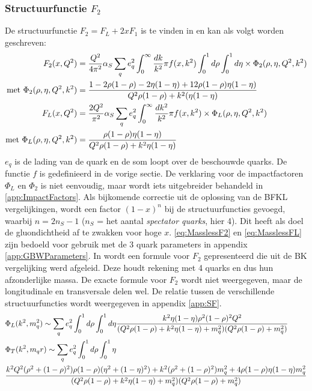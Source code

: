 \documentclass[a4paper,11pt]{article}
\numberwithin{equation}{section} %
\begin{document}
    \subsubsection{Structuurfunctie $F_2$} \label{sec:SF}
De structuurfunctie $F_2 = F_L + 2x F_1$ is te vinden in \cite[vgl. 9.200]{Barone} en kan als volgt worden geschreven:
\begin{align} \label{eq:MasslessF2}
F_2(x,Q^2) &= \frac{Q^2}{4\pi^2} \alpha_S \sum_q e_q^2 \int_0^\infty \frac{dk}{k^2}\pi f(x,k^2) \int_0^1 d\rho \int_0^1 d\eta \times \Phi_2(\rho, \eta, Q^2, k^2) \\
\text{met } \Phi_2(\rho, \eta, Q^2, k^2) &= \frac{1-2\rho(1-\rho)-2\eta(1-\eta)+12\rho(1-\rho)\eta(1-\eta)}{Q^2 \rho(1-\rho) + k^2 (\eta(1-\eta)}\notag \\
F_L(x,Q^2) &= \frac{2 Q^2}{\pi^2} \alpha_S \sum_q e_q^2 \int_0^\infty \frac{dk^2}{k^2} \pi f(x,k^2) \times \Phi_L(\rho, \eta, Q^2, k^2) \label{eq:MasslessFL} \\
\text{met } \Phi_L(\rho, \eta, Q^2, k^2) &= \frac{\rho(1-\rho)\eta(1-\eta)}{Q^2 \rho(1-\rho)+k^2 \eta(1-\eta)} \notag 
\end{align}
$e_q$ is de lading van de quark en de som loopt over de beschouwde quarks.
De functie $f$ is gedefinieerd in de vorige sectie.
De verklaring voor de impactfactoren $\Phi_L$ en $\Phi_2$ is niet eenvoudig, maar wordt iets uitgebreider behandeld in \ref{app:ImpactFactors}.
Als bijkomende correctie uit de oplossing van de BFKL vergelijkingen, wordt een factor $(1-x)^{n}$ bij de structuurfuncties gevoegd, waarbij $n = 2 n_S -1$ ($n_S$ = het aantal \textit{spectator quarks}, hier 4).
Dit heeft als doel de gluondichtheid af te zwakken voor hoge $x$.
\eqref{eq:MasslessF2} en \eqref{eq:MasslessFL} zijn bedoeld voor gebruik met de 3 quark parameters in appendix \ref{app:GBWParameters}.
In \cite{Bondarenko} wordt een formule voor $F_2$ gepresenteerd die uit de BK vergelijking werd afgeleid.
Deze houdt rekening met 4 quarks en dus hun afzonderlijke massa.
De exacte formule voor $F_2$ wordt niet weergegeven, maar de longitudinale en transversale delen wel.
De relatie tussen de verschillende structuurfuncties wordt weergegeven in appendix \ref{app:SF}.
\begin{align} \label{eq:MassiveSF}
&\Phi_L(k^2, m_q^2) \sim \sum_q e_q^2 \int_0^1 d\rho \int_0^1 d\eta \frac{k^2 \eta(1-\eta)\rho^2(1-\rho)^2 Q^2}{(Q^2\rho(1-\rho)+k^2\eta(1-\eta)+m_q^2)(Q^2\rho(1-\rho)+m_q^2)} \\
&\Phi_T(k^2, m_q^^2) \sim \sum_q e_q^2 \int_0^1 d\rho \int_0^1 \eta \notag \\
&\frac{k^2 Q^2 (\rho^2+(1-\rho)^2)\rho(1-\rho)(\eta^2+(1-\eta)^2)+k^2(\rho^2+(1-\rho)^2)m_q^2 + 4\rho(1-\rho)\eta(1-\eta)m_q^2}{(Q^2\rho(1-\rho)+k^2\eta(1-\eta)+m_q^2)(Q^2\rho(1-\rho)+m_q^2)}
\end{align}
\end{document}
